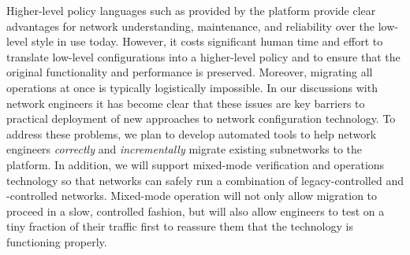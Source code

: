 Higher-level policy languages such as provided by the \Name platform provide clear advantages for network understanding, maintenance, and reliability over the low-level style in use today.  
However, it costs significant human time and effort to translate low-level configurations into a higher-level policy and to ensure that the original functionality and performance is preserved.  Moreover, migrating all operations at once is typically logistically impossible.   In our discussions with network engineers it has become clear that these issues are key barriers to practical deployment of new approaches to network configuration technology.  To address these problems, we plan to develop automated tools to help network engineers
\emph{correctly} and \emph{incrementally} migrate existing subnetworks to the \Name platform.  In addition, we will
support mixed-mode verification and operations technology so that networks can safely
run a combination of legacy-controlled and \Name-controlled networks.  Mixed-mode operation will not only allow
migration to proceed in a slow, controlled fashion, but will also allow engineers to test \Name on a tiny fraction of their
traffic first to reassure them that the technology is functioning properly.






